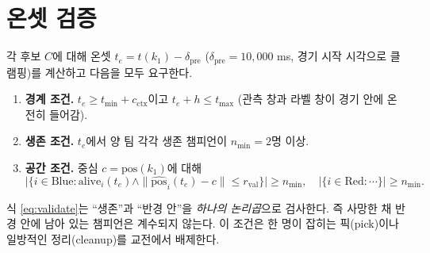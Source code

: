 
\section{온셋 검증}
\label{sec:loc-validate}

각 후보 $C$에 대해 온셋 $t_e = t(k_1) - \delta_{\mathrm{pre}}$ ($\delta_{\mathrm{pre}} = 10{,}000$ ms, 경기 시작 시각으로 클램핑)를 계산하고 다음을 모두 요구한다.

\begin{enumerate}[leftmargin=2em]
  \item \textbf{경계 조건.} $t_e \ge t_{\min} + c_{\mathrm{ctx}}$이고 $t_e + h \le t_{\max}$ (관측 창과 라벨 창이 경기 안에 온전히 들어감).
  \item \textbf{생존 조건.} $t_e$에서 양 팀 각각 생존 챔피언이 $n_{\min} = 2$명 이상.
  \item \textbf{공간 조건.} 중심 $c = \mathrm{pos}(k_1)$에 대해
  \begin{equation}
    \big|\{i \in \mathrm{Blue} : \mathrm{alive}_i(t_e) \wedge \|\widehat{\mathrm{pos}}_i(t_e) - c\| \le r_{\mathrm{val}}\}\big| \ge n_{\min}, \quad
    \big|\{i \in \mathrm{Red} : \cdots\}\big| \ge n_{\min}.
    \label{eq:validate}
  \end{equation}
\end{enumerate}
식 \eqref{eq:validate}는 ``생존''과 ``반경 안''을 \emph{하나의 논리곱}으로 검사한다. 즉 사망한 채 반경 안에 남아 있는 챔피언은 계수되지 않는다. 이 조건은 한 명이 잡히는 픽(pick)이나 일방적인 정리(cleanup)를 교전에서 배제한다.
